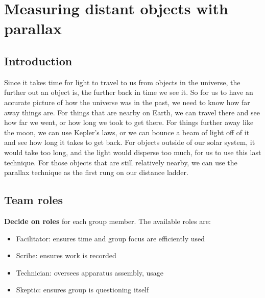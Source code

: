 \chapter{Measuring distant objects with parallax}




\section{Introduction}

Since it takes time for light to travel to us from objects in the universe, the further out an object is, the further back in time we see it. So for us to have an accurate picture of how the universe was in the past, we need to know how far away things are. For things that are nearby on Earth, we can travel there and see how far we went, or how long we took to get there. For things further away like the moon, we can use Kepler's laws, or we can bounce a beam of light off of it and see how long it takes to get back. For objects outside of our solar system, it would take too long, and the light would disperse too much, for us to use this last technique. For those objects that are still relatively nearby, we can use the parallax technique as the first rung on our distance ladder.

\section{Team roles}

\textbf{Decide on roles} for each group member. The available roles are:

\begin{itemize}
	\item Facilitator: ensures time and group focus are efficiently used
	\item Scribe: ensures work is recorded
	\item Technician: oversees apparatus assembly, usage
	\item Skeptic: ensures group is questioning itself
\end{itemize}

